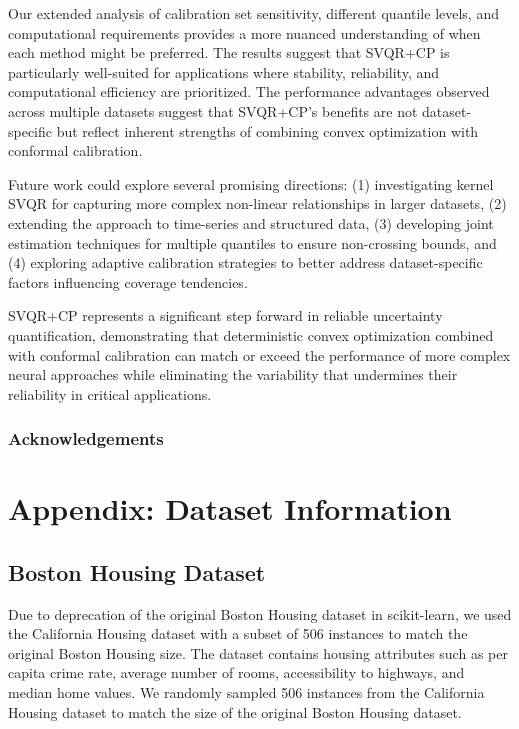 \documentclass{article}
\begin{document}
Our extended analysis of calibration set sensitivity, different quantile levels, and computational requirements provides a more nuanced understanding of when each method might be preferred. The results suggest that SVQR+CP is particularly well-suited for applications where stability, reliability, and computational efficiency are prioritized. The performance advantages observed across multiple datasets suggest that SVQR+CP's benefits are not dataset-specific but reflect inherent strengths of combining convex optimization with conformal calibration.

Future work could explore several promising directions: (1) investigating kernel SVQR for capturing more complex non-linear relationships in larger datasets, (2) extending the approach to time-series and structured data, (3) developing joint estimation techniques for multiple quantiles to ensure non-crossing bounds, and (4) exploring adaptive calibration strategies to better address dataset-specific factors influencing coverage tendencies.

SVQR+CP represents a significant step forward in reliable uncertainty quantification, demonstrating that deterministic convex optimization combined with conformal calibration can match or exceed the performance of more complex neural approaches while eliminating the variability that undermines their reliability in critical applications.

\subsubsection*{Acknowledgements}




\appendix

\section{Appendix: Dataset Information}
\label{app:datasets}

\subsection{Boston Housing Dataset}
Due to deprecation of the original Boston Housing dataset in scikit-learn, we used the California Housing dataset with a subset of 506 instances to match the original Boston Housing size. The dataset contains housing attributes such as per capita crime rate, average number of rooms, accessibility to highways, and median home values. We randomly sampled 506 instances from the California Housing dataset to match the size of the original Boston Housing dataset.
\end{document}
